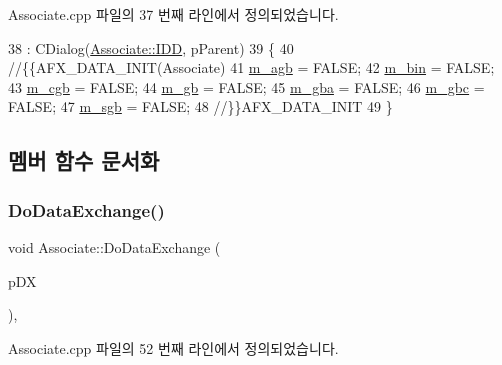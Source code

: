 Associate.\+cpp 파일의 37 번째 라인에서 정의되었습니다.


\begin{DoxyCode}
38   : CDialog(\mbox{\hyperlink{class_associate_a9696cb7dfd5bf0a5f848d1c0209ca4f8a9cf64942c919128a9b1295ae3bed6bce}{Associate::IDD}}, pParent)
39 \{
40   \textcolor{comment}{//\{\{AFX\_DATA\_INIT(Associate)}
41   \mbox{\hyperlink{class_associate_ab6d59a4b47c5529c1e5f5b8f8b5a6f82}{m\_agb}} = FALSE;
42   \mbox{\hyperlink{class_associate_ac132c6bfb6f547702c2e7386650a0a4c}{m\_bin}} = FALSE;
43   \mbox{\hyperlink{class_associate_af245524b613121a7a5291deebfb97e0e}{m\_cgb}} = FALSE;
44   \mbox{\hyperlink{class_associate_af4479f05150eb128332d06cba68a955b}{m\_gb}} = FALSE;
45   \mbox{\hyperlink{class_associate_a7c20c41d1b724e80532ff888b6c7ea56}{m\_gba}} = FALSE;
46   \mbox{\hyperlink{class_associate_a399cc9528f3efc32ec5971fc5e614e97}{m\_gbc}} = FALSE;
47   \mbox{\hyperlink{class_associate_a0221f6743a817911817d464579b4a038}{m\_sgb}} = FALSE;
48   \textcolor{comment}{//\}\}AFX\_DATA\_INIT}
49 \}
\end{DoxyCode}


\subsection{멤버 함수 문서화}
\mbox{\label{class_associate_af10575d274826cc658ebb2e6a823aa35}} 
\subsubsection{\texorpdfstring{Do\+Data\+Exchange()}{DoDataExchange()}}
{\footnotesize\ttfamily void Associate\+::\+Do\+Data\+Exchange (\begin{DoxyParamCaption}\item[{C\+Data\+Exchange $\ast$}]{p\+DX }\end{DoxyParamCaption})\hspace{0.3cm}{\ttfamily [protected]}, {\ttfamily [virtual]}}



Associate.\+cpp 파일의 52 번째 라인에서 정의되었습니다.


